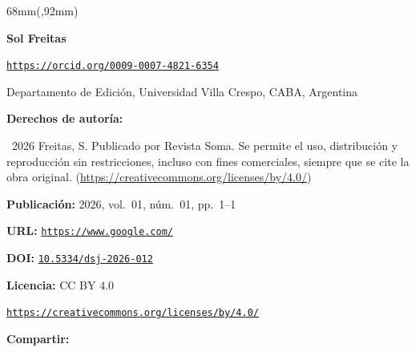 \begin{textblock*}{68mm}(\gbbloquex,92mm)
{\setlength{\leftskip}{0pt}\setlength{\parindent}{0pt}%
\noindent\begin{minipage}[t]{68mm}
\sffamily\small\setlength{\parskip}{1pt}
{\bfseries\color{azulrevista}Sol Freitas}\par
{\scriptsize\texttt{\href{https://orcid.org/0009-0007-4821-6354}{https://orcid.org/0009-0007-4821-6354}}}\par
Departamento de Edición, Universidad Villa Crespo, CABA, Argentina\par
\vspace{6pt}
{\bfseries\color{azulrevista!70}Derechos de autor\'ia:}\par
\textcopyright\ 2026 Freitas, S. Publicado por Revista Soma. Se permite el uso, distribución y reproducción sin restricciones, incluso con fines comerciales, siempre que se cite la obra original. (\href{https://creativecommons.org/licenses/by/4.0/}{https://creativecommons.org/licenses/by/4.0/})\par\vspace{6pt}
{\bfseries\color{azulrevista!70}Publicación:} 2026, vol.~01, n\'um.~01, pp.~1--1\par\vspace{6pt}
{\bfseries\color{azulrevista!70}URL:} {\scriptsize\texttt{\href{https://www.google.com/}{https://www.google.com/}}}\par\vspace{6pt}
{\bfseries\color{azulrevista!70}DOI:} {\scriptsize\texttt{\href{https://doi.org/10.5334/dsj-2026-012}{10.5334/dsj-2026-012}}}\par\vspace{6pt}
{\bfseries\color{azulrevista!70}Licencia:} CC BY 4.0\par
{\scriptsize\texttt{\href{https://creativecommons.org/licenses/by/4.0/}{https://creativecommons.org/licenses/by/4.0/}}}\par
\vspace{6pt}
\vspace{6pt}
{\bfseries\color{azulrevista!70}Compartir:}\par\vspace{3pt}
{\large
\href{https://bsky.app/intent/compose?text=https%3A%2F%2Fwww.google.com%2F}{}~
\href{mailto:?subject=Rese%C3%B1a%20bibliogr%C3%A1fica&body=https%3A%2F%2Fwww.google.com%2F}{}~
}
\end{minipage}}
\end{textblock*}
